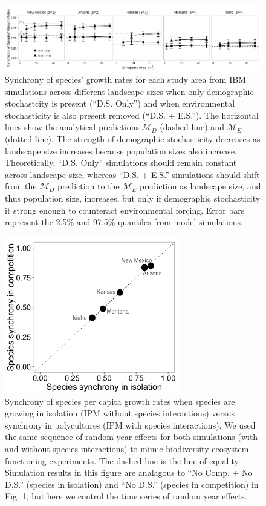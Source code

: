 \documentclass[12pt,]{article}
\begin{document}
\begin{figure}[!ht]
  \centering
      \includegraphics[width=6in]{./components/formatted_figures/formatted_figure2.png}
  \caption{Synchrony of species' growth rates for each study area from IBM simulations across different landscape sizes when only demographic stochastcity is present (``D.S. Only'') and when environmental stochasticity is also present removed (``D.S. + E.S.''). The horizontal lines show the analytical predictions $\mathcal{M}_D$ (dashed line) and $\mathcal{M}_E$ (dotted line). The strength of demographic stochasticity decreases as landscape size increases because population sizes also increase. Theoretically, ``D.S. Only'' simulations should remain constant across landscape size, whereas ``D.S. + E.S.'' simulations should shift from the $\mathcal{M}_D$ prediction to the $\mathcal{M}_E$ prediction as landscape size, and thus population size, increases, but only if demographic stochasticity it strong enough to counteract environmental forcing. Error bars represent the 2.5\% and 97.5\% quantiles from model simulations.}
\end{figure}

\pagebreak{}

\begin{figure}[!ht]
  \centering
      \includegraphics[width=3in]{./components/formatted_figures/formatted_figure3.png}
  \caption{Synchrony of species per capita growth rates when species are growing in isolation (IPM without species interactions) versus synchrony in polycultures (IPM with species interactions). We used the same sequence of random year effects for both simulations (with and without species interactions) to mimic biodiversity-ecosystem functioning experiments. The dashed line is the line of equality. Simulation results in this figure are analagous to ``No Comp. + No D.S.'' (species in isolation) and ``No D.S.'' (species in competition) in Fig. 1, but here we control the time series of random year effects.}
\end{figure}
\end{document}
